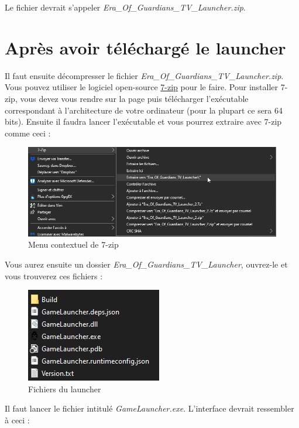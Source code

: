 \documentclass[a4paper, 10pt]{article}
\begin{document}
	Le fichier devrait s'appeler \textit{Era\_Of\_Guardians\_TV\_Launcher.zip}.
	
	\section{Après avoir téléchargé le launcher}
	Il faut ensuite décompresser le fichier \textit{Era\_Of\_Guardians\_TV\_Launcher.zip}. Vous pouvez utiliser le logiciel open-source \href{https://www.7-zip.fr/}{7-zip} pour le faire. Pour installer 7-zip, vous devez vous rendre sur la page puis télécharger l'exécutable correspondant à l'architecture de votre ordinateur (pour la plupart ce sera 64 bits). Ensuite il faudra lancer l'exécutable et vous pourrez extraire avec 7-zip comme ceci :
	
	\begin{figure}[ht]
		\centering
		\includegraphics[scale=0.6]{images/7zip_menu.png}
		\caption{Menu contextuel de 7-zip}
	\end{figure}
	
	Vous aurez ensuite un dossier \textit{Era\_Of\_Guardians\_TV\_Launcher}, ouvrez-le et vous trouverez ces 
	fichiers : 
	
	\begin{figure}[ht]
		\centering
		\includegraphics[scale=0.8]{images/fichiers.png}
		\caption{Fichiers du launcher}
	\end{figure}

	Il faut lancer le fichier intitulé \textit{GameLauncher.exe}. L'interface devrait ressembler à ceci :
	
\end{document}
